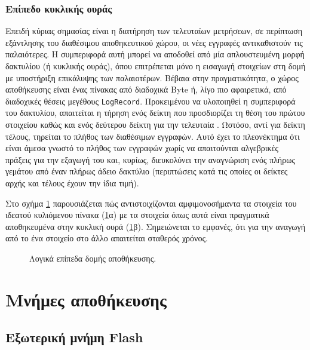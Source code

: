 \subsubsection{Επίπεδο κυκλικής ουράς}

Επειδή κύριας σημασίας είναι η διατήρηση των τελευταίων μετρήσεων, σε περίπτωση
εξάντλησης του διαθέσιμου αποθηκευτικού χώρου, οι νέες εγγραφές αντικαθιστούν
τις παλαιότερες. Η συμπεριφορά αυτή μπορεί να αποδοθεί από μία απλουστευμένη
μορφή δακτυλίου (ή κυκλικής ουράς), όπου επιτρέπεται μόνο η εισαγωγή στοιχείων
στη δομή με υποστήριξη επικάλυψης των παλαιοτέρων. Βέβαια στην πραγματικότητα, ο
χώρος αποθήκευσης είναι ένας πίνακας από διαδοχικά Byte ή, λίγο πιο αφαιρετικά,
από διαδοχικές θέσεις μεγέθους \verb~LogRecord~. Προκειμένου να υλοποιηθεί η
συμπεριφορά του δακτυλίου, απαιτείται η τήρηση ενός δείκτη που προσδιορίζει τη
θέση του πρώτου στοιχείου καθώς και ενός δεύτερου δείκτη για την τελευταία
\parencite[131]{kolias04}. Ωστόσο, αντί για δείκτη τέλους, τηρείται το πλήθος
των διαθέσιμων εγγραφών. Αυτό έχει το πλεονέκτημα ότι είναι άμεσα γνωστό το
πλήθος των εγγραφών χωρίς να απαιτούνται αλγεβρικές πράξεις για την εξαγωγή του
και, κυρίως, διευκολύνει την αναγνώριση ενός πλήρως γεμάτου από έναν πλήρως
άδειο δακτύλιο (περιπτώσεις κατά τις οποίες οι δείκτες αρχής και τέλους έχουν
την ίδια τιμή).

Στο σχήμα \ref{fig:log:structure} παρουσιάζεται πώς αντιστοιχίζονται
αμφιμονοσήμαντα τα στοιχεία του ιδεατού κυλιόμενου πίνακα
(\ref{fig:log:structure}α) με τα στοιχεία όπως αυτά είναι πραγματικά
αποθηκευμένα στην κυκλική ουρά (\ref{fig:log:structure}β). Σημειώνεται το
εμφανές, ότι για την αναγωγή από το ένα στοιχείο στο άλλο απαιτείται σταθερός
χρόνος.

\begin{figure}
    \caption{Λογικά επίπεδα δομής αποθήκευσης.\label{fig:log:structure}}
\begin{center}%
    \def\svgwidth{0.7\textwidth}
    
\end{center}
\end{figure}


\section{Μνήμες αποθήκευσης} %

\subsection{Εξωτερική μνήμη Flash}

